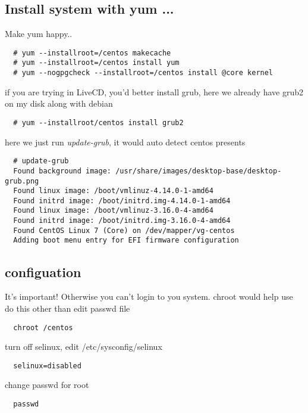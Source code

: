 \subsection{Install system with yum ...}
Make yum happy..
\begin{lstlisting}
  # yum --installroot=/centos makecache
  # yum --installroot=/centos install yum
  # yum --nogpgcheck --installroot=/centos install @core kernel
\end{lstlisting}

if you are trying in LiveCD, you'd better install grub, here we already have grub2 on my disk along with debian
\begin{lstlisting}
  # yum --installroot/centos install grub2
\end{lstlisting}
here we just run \emph{update-grub}, it would auto detect centos presents
\begin{lstlisting}
  # update-grub
  Found background image: /usr/share/images/desktop-base/desktop-grub.png
  Found linux image: /boot/vmlinuz-4.14.0-1-amd64
  Found initrd image: /boot/initrd.img-4.14.0-1-amd64
  Found linux image: /boot/vmlinuz-3.16.0-4-amd64
  Found initrd image: /boot/initrd.img-3.16.0-4-amd64
  Found CentOS Linux 7 (Core) on /dev/mapper/vg-centos
  Adding boot menu entry for EFI firmware configuration
\end{lstlisting}
\subsection{configuation}
It's important! Otherwise you can't login to you system.
{\ttfamily chroot} would help use do this other than edit passwd file
\begin{lstlisting}
  chroot /centos
\end{lstlisting}
turn off selinux, edit /etc/sysconfig/selinux
\begin{lstlisting}
  selinux=disabled
\end{lstlisting}

change passwd for root
\begin{lstlisting}
  passwd
  
\end{lstlisting}










